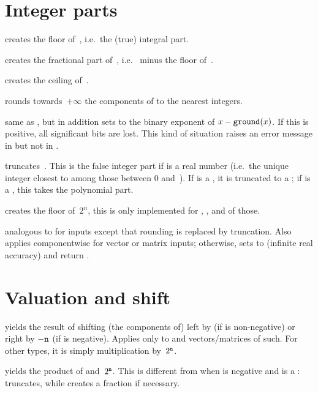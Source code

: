 \section{Integer parts}

 creates the floor of~, i.e.\ the (true)
integral part.

 creates the fractional part of~, i.e.\ 
minus the floor of~.

 creates the ceiling of~.

 rounds towards~$+\infty$ the components of 
to the nearest integers.

 same as , but in addition sets
 to the binary exponent of $x - {\tt ground}(x)$. If this is
positive, all significant bits are lost. This kind of situation raises an
error message in  but not in .

 truncates~. This is the false integer part
if  is a real number (i.e.~the unique integer closest to  among
those between 0 and~). If  is a , it is truncated
to a ; if  is a , this takes the polynomial part.

 creates the floor of~$2^n$, this is
only implemented for , ,  and  of those.

 analogous to  for
 inputs except that rounding is replaced by truncation. Also applies
componentwise for vector or matrix inputs; otherwise, sets  to
 (infinite real accuracy) and return .

\section{Valuation and shift}

 yields the result of shifting
(the components of)  left by  (if  is non-negative)
or right by $-{\tt n}$ (if  is negative). Applies only to 
and vectors/matrices of such. For other types, it is simply multiplication
by~$2^{{\tt n}}$.

 yields the product of 
and~$2^{{\tt n}}$. This is different from  when  is negative
and  is a :  truncates, while 
creates a fraction if necessary.

